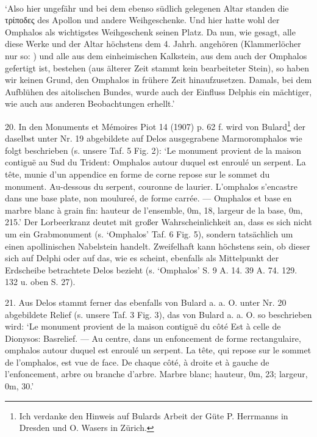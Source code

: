 \documentclass[a4paper, 11pt, oneside]{article}
\newcommand*\svgAAD{}
\begin{document}
\paragraph{}
`Also hier ungefähr und bei dem ebenso südlich gelegenen Altar standen die τρίποδες des Apollon und andere Weihgeschenke. Und hier hatte wohl der Omphalos als wichtigstes Weihgeschenk seinen Platz. Da nun, wie gesagt, alle diese Werke und der Altar höchstens dem 4. Jahrh. angehören (Klammerlöcher nur so: $\svgAAD$) und alle aus dem einheimischen Kalkstein, aus dem auch der Omphalos gefertigt ist, bestehen (aus älterer Zeit stammt kein bearbeiteter Stein), so haben wir keinen Grund, den Omphalos in frühere Zeit hinaufzusetzen. Damals, bei dem Aufblühen des aitolischen Bundes, wurde auch der Einfluss Delphis ein mächtiger, wie auch aus anderen Beobachtungen erhellt.'

20. In den Monuments et Mémoires Piot 14 (1907) p. 62 f. wird von Bulard\footnote{Ich verdanke den Hinweis auf Bulards Arbeit der Güte P. Herrmanns in Dresden und O. Wasers in Zürich.} der daselbst unter Nr. 19 abgebildete auf Delos ausgegrabene Marmoromphalos wie folgt beschrieben (s. unsere Taf. 5 Fig. 2): `Le monument provient de la maison contiguë au Sud du Trident: Omphalos autour duquel est enroulé un serpent. La tête, munie d'un appendice en forme de corne repose sur le sommet du monument. Au-dessous du serpent, couronne de laurier. L'omphalos s'encastre dans une base plate, non moulureé, de forme carrée. --- Omphalos et base en marbre blanc à grain fin: hauteur de l'ensemble, 0m, 18, largeur de la base, 0m, 215.' Der Lorbeerkranz deutet mit großer Wahrscheinlichkeit an, dass es sich nicht um ein Grabmonument (s. `Omphalos' Taf. 6 Fig. 5), sondern tatsächlich um einen apollinischen Nabelstein handelt. Zweifelhaft kann höchstens sein, ob dieser sich auf Delphi oder auf das, wie es scheint, ebenfalls als Mittelpunkt der Erdscheibe betrachtete Delos bezieht (s. `Omphalos' S. 9 A. 14. 39 A. 74. 129. 132 u. oben S. 27).

21. Aus Delos stammt ferner das ebenfalls von Bulard a. a. O. unter Nr. 20 abgebildete Relief (s. unsere Taf. 3 Fig. 3), das von Bulard a. a. O. so beschrieben wird: `Le monument provient de la maison contiguë du côté Est à celle de Dionysos: Basrelief. --- Au centre, dans un enfoncement de forme rectangulaire, omphalos autour duquel est enroulé un serpent. La tête, qui repose sur le sommet de l'omphalos, est vue de face. De chaque côté, à droite et à gauche de l'enfoncement, arbre ou branche d'arbre. Marbre blanc; hauteur, 0m, 23; largeur, 0m, 30.'
\end{document}
